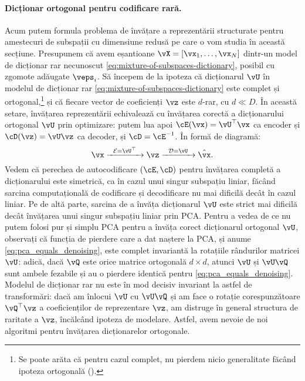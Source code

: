 \documentclass[../../book-main_ro.tex]{subfiles}
\begin{document}
\paragraph{Dicționar ortogonal pentru codificare rară.}
Acum putem formula problema de învățare a reprezentării structurate pentru amestecuri de subspații cu dimensiune redusă pe care o vom studia în această secțiune.
Presupunem că avem eșantioane $\vX = [\vx_1, \dots, \vx_N]$ dintr-un model de dicționar rar necunoscut \eqref{eq:mixture-of-subspaces-dictionary}, posibil cu zgomote adăugate $\veps_i$.
Să începem de la ipoteza că dicționarul $\vU$ în modelul de dicționar
rar \eqref{eq:mixture-of-subspaces-dictionary} este complet și
ortogonal,\footnote{Se poate arăta că pentru cazul complet, nu pierdem nicio generalitate făcând ipoteza ortogonală ().} și că fiecare vector de coeficienți $\vz$ este $d$-rar, cu $d \ll D$.
În această setare, învățarea reprezentării echivalează cu învățarea corectă a dicționarului ortogonal $\vU$ prin optimizare: putem
lua apoi $\cE(\vx) = \vU^\top \vx$ ca encoder și $\cD(\vz) = \vU \vz$
ca decoder, și $\cD = \cE^{-1}$. În formă de diagramă:
\begin{equation}
\vx \xrightarrow{\hspace{2mm} \mathcal{E} = \vU^\top \hspace{2mm}}  \vz \xrightarrow{\hspace{2mm} \mathcal{D} = \vU \hspace{2mm}}   \hat{\vx}.  
\label{eqn:autoencoding-DL}
\end{equation}    
Vedem că perechea de autocodificare $(\cE, \cD)$ pentru învățarea completă a dicționarului este simetrică, ca în cazul unui singur subspațiu liniar, făcând sarcina computațională de codificare și decodificare nu mai dificilă decât în cazul liniar. Pe de altă parte, sarcina de a învăța dicționarul $\vU$ este strict mai dificilă decât învățarea unui singur subspațiu liniar prin PCA.
Pentru a vedea de ce nu putem folosi pur și simplu PCA pentru a învăța corect dicționarul ortogonal $\vU$, observați că 
funcția de pierdere care a dat naștere la PCA, și anume \eqref{eq:pca_equals_denoising}, este
complet invariantă la rotațiile rândurilor matricei $\vU$: adică, dacă
$\vQ$ este orice matrice ortogonală $d \times d$, atunci $\vU$ și $\vU \vQ$ sunt ambele
fezabile și au o pierdere identică pentru \eqref{eq:pca_equals_denoising}.
Modelul de dicționar rar nu este în mod decisiv invariant la astfel de transformări: dacă
am înlocui $\vU$ cu $\vU \vQ$ și am face o rotație corespunzătoare $\vQ^\top \vz$
a coeficienților de reprezentare $\vz$, am distruge în general structura de raritate a $\vz$, încălcând ipoteza de modelare. Astfel, avem nevoie de noi algoritmi pentru învățarea dicționarelor ortogonale.
\end{document}
